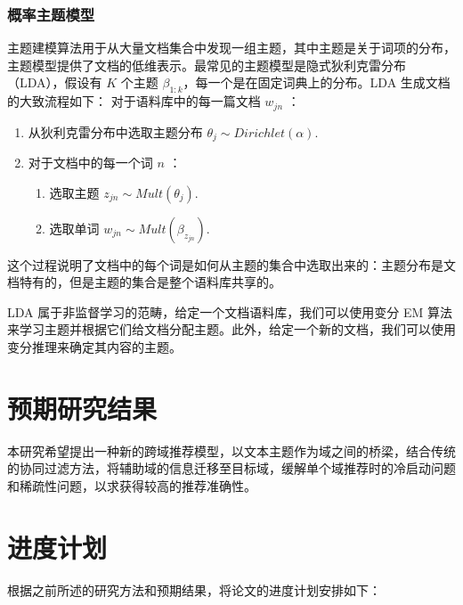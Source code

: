 \subsection{概率主题模型}
主题建模算法用于从大量文档集合中发现一组主题，其中主题是关于词项的分布，主题模型提供了文档的低维表示\cite{Chang2009Reading}。最常见的主题模型是隐式狄利克雷分布（LDA）\cite{Blei2003Latent}，假设有 $K$ 个主题 $\beta_{1:k}$，每一个是在固定词典上的分布。LDA 生成文档的大致流程如下：
对于语料库中的每一篇文档 $w_{jn}$ ：
\begin{enumerate}[itemindent=1em]
\item 从狄利克雷分布中选取主题分布 $\theta_j \sim Dirichlet(\alpha).$
\item 对于文档中的每一个词 $n$ ：
	\begin{enumerate}[itemindent=1em]
		\item 选取主题 $z_{jn} \sim Mult(\theta_j).$
		\item 选取单词 $w_{jn} \sim Mult(\beta_{z_{jn}}).$ 
	\end{enumerate}
\end{enumerate}
这个过程说明了文档中的每个词是如何从主题的集合中选取出来的：主题分布是文档特有的，但是主题的集合是整个语料库共享的。

LDA 属于非监督学习的范畴，给定一个文档语料库，我们可以使用变分 EM 算法来学习主题并根据它们给文档分配主题。此外，给定一个新的文档，我们可以使用变分推理来确定其内容的主题\cite{Blei2003Latent}。


\chapter{预期研究结果}
本研究希望提出一种新的跨域推荐模型，以文本主题作为域之间的桥梁，结合传统的协同过滤方法，将辅助域的信息迁移至目标域，缓解单个域推荐时的冷启动问题和稀疏性问题，以求获得较高的推荐准确性。

\chapter{进度计划} 
根据之前所述的研究方法和预期结果，将论文的进度计划安排如下：

